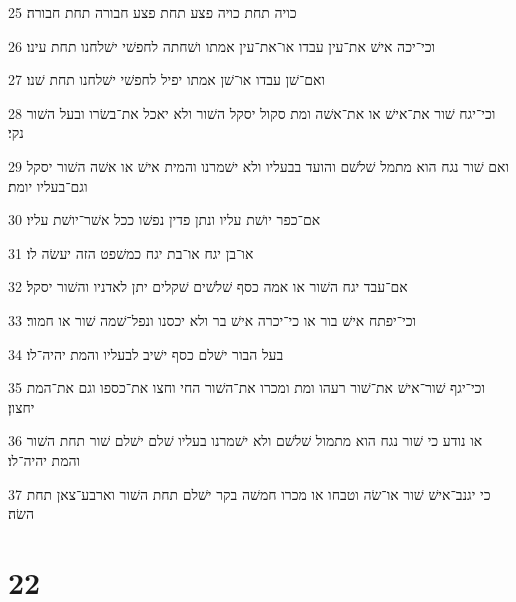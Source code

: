 \par 25 כויה תחת כויה פצע תחת פצע חבורה תחת חבורה׃
\par 26 וכי־יכה אישׁ את־עין עבדו או־את־עין אמתו ושׁחתה לחפשׁי ישׁלחנו תחת עינו׃
\par 27 ואם־שׁן עבדו או־שׁן אמתו יפיל לחפשׁי ישׁלחנו תחת שׁנו׃
\par 28 וכי־יגח שׁור את־אישׁ או את־אשׁה ומת סקול יסקל השׁור ולא יאכל את־בשׂרו ובעל השׁור נקי׃
\par 29 ואם שׁור נגח הוא מתמל שׁלשׁם והועד בבעליו ולא ישׁמרנו והמית אישׁ או אשׁה השׁור יסקל וגם־בעליו יומת׃
\par 30 אם־כפר יושׁת עליו ונתן פדין נפשׁו ככל אשׁר־יושׁת עליו׃
\par 31 או־בן יגח או־בת יגח כמשׁפט הזה יעשׂה לו׃
\par 32 אם־עבד יגח השׁור או אמה כסף שׁלשׁים שׁקלים יתן לאדניו והשׁור יסקל׃
\par 33 וכי־יפתח אישׁ בור או כי־יכרה אישׁ בר ולא יכסנו ונפל־שׁמה שׁור או חמור׃
\par 34 בעל הבור ישׁלם כסף ישׁיב לבעליו והמת יהיה־לו׃
\par 35 וכי־יגף שׁור־אישׁ את־שׁור רעהו ומת ומכרו את־השׁור החי וחצו את־כספו וגם את־המת יחצון׃
\par 36 או נודע כי שׁור נגח הוא מתמול שׁלשׁם ולא ישׁמרנו בעליו שׁלם ישׁלם שׁור תחת השׁור והמת יהיה־לו׃
\par 37 כי יגנב־אישׁ שׁור או־שׂה וטבחו או מכרו חמשׁה בקר ישׁלם תחת השׁור וארבע־צאן תחת השׂה׃

\chapter{22}

